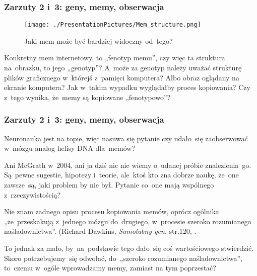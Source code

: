 \documentclass[10pt,t]{beamer}
\begin{document}
\begin{frame}
  \frametitle{Zarzuty 2 i~3: geny, memy, obserwacja}


  \begin{figure}

    \centering
    \texttt{[image: ./PresentationPictures/Mem\_structure.png]}

    \caption{Jaki mem może być bardziej widoczny od~tego?}

  \end{figure}


  Konkretny mem internetowy, to „fenotyp memu”, czy więc ta
  struktura na~obrazku, to jego „genotyp”? A~może za genotyp
  należy uważać strukturę plików graficznego w~którejś z~pamięci
  komputera? Albo obraz oglądany na ekranie komputera? Jak w~takim wypadku
  wyglądałby proces kopiowania? Czy z~tego wynika, że~memy są kopiowane
  „fenotypowo”?

\end{frame}





\begin{frame}
  \frametitle{Zarzuty 2 i~3: geny, memy, obserwacja}


  Neuronauka jest na topie, więc nasuwa się pytanie
  czy udało~się zaobserwować w~mózgu analog helisy DNA dla~memów?

  Ani McGrath w~2004, ani ja dziś nic nie wiemy o~udanej próbie
  znalezienia~go. Są~pewne sugestie, hipotezy i~teorie, ale~ktoś kto
  zna dobrze naukę, że~one zawsze~są, jaki problem by nie był.
  Pytanie co~one mają wspólnego z~rzeczywistością?

  Nie znam żadnego opisu procesu kopiowania memów, oprócz ogólnika
  „że~przeskakują z~jednego mózgu do~drugiego, w~procesie szeroko
  rozumianego naśladownictwa”. (Richard Dawkins, \textit{Samolubny gen},
  str.120, \cite{McGrathBogDawkinsa2008}.

  To jednak za mało, by~na~podstawie tego dało~się coś wartościowego
  stwierdzić. Skoro potrzebujemy~się odwołać, do~„szeroko
  rozumianego naśladownictwa”, to~czemu w~ogóle wprowadzamy memy,
  zamiast na tym poprzestać?

\end{frame}
\end{document}
